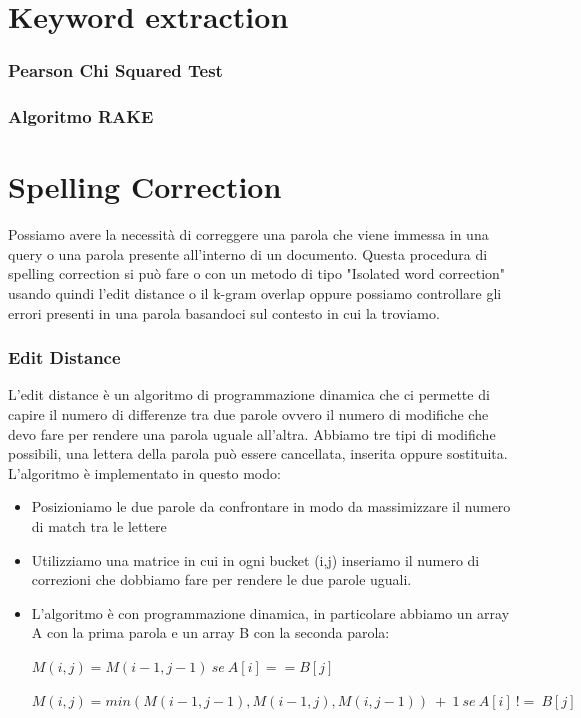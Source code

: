 \documentclass[14pt]{extreport}
\begin{document}
\chapter{Keyword extraction}

\subsection{Pearson Chi Squared Test}

\subsection{Algoritmo RAKE}


\chapter{Spelling Correction}

Possiamo avere la necessità di correggere una parola che viene immessa in una query o una parola presente all'interno di un documento. Questa procedura di spelling correction si può fare o con un metodo di tipo "Isolated word correction" usando quindi l'edit distance o il k-gram overlap oppure possiamo controllare gli errori presenti in una parola basandoci sul contesto in cui la troviamo.

\subsection{Edit Distance}

L'edit distance è un algoritmo di programmazione dinamica che ci permette di capire il numero di differenze tra due parole ovvero il numero di modifiche che devo fare per rendere una parola uguale all'altra. Abbiamo tre tipi di modifiche possibili, una lettera della parola può essere cancellata, inserita oppure sostituita.
L'algoritmo è implementato in questo modo:
\begin{itemize}
    \item Posizioniamo le due parole da confrontare in modo da massimizzare il numero di match tra le lettere
    \item Utilizziamo una matrice in cui in ogni bucket (i,j) inseriamo il numero di correzioni che dobbiamo fare per rendere le due parole uguali.
    \item L'algoritmo è con programmazione dinamica, in particolare abbiamo un array A con la prima parola e un array B con la seconda parola:
    \centerline{$M(i,j) = M(i-1,j-1)\ se\ A[i] == B[j]$}
    \centerline{$M(i,j) = min(M(i-1,j-1), M(i-1,j), M(i,j-1))\ +\ 1\ se\ A[i]\ !=\ B[j]$}
\end{itemize}
\end{document}
